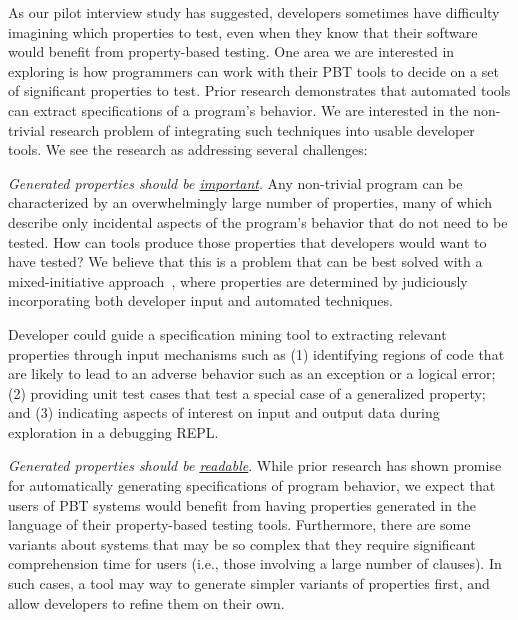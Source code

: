 
 

As our pilot interview study has suggested, developers sometimes have
difficulty imagining which properties to test, even when they know that their
software would benefit from property-based testing. One area we are interested
in exploring is how programmers can work with their PBT tools to decide on a set
of significant properties to test.  Prior research demonstrates that automated
tools can extract specifications of a program's
behavior\cite{ammons2002mining,le2018deep,claessen2010quickspec}. We are
interested in the non-trivial research problem of integrating such techniques
into usable developer tools. We see the research as addressing several
challenges:

\textit{Generated properties should be \underline{important}}. Any non-trivial
program can be characterized by an overwhelmingly large number of properties,
many of which describe only incidental aspects of the program's behavior that do
not need to be tested. How can tools produce those properties that developers
would want to have tested? We believe that this is a problem that can be best
solved with a mixed-initiative approach~\cite{allen1999mixed}, where properties
are determined by judiciously incorporating both developer input and automated
techniques.

Developer could guide a specification mining tool to extracting relevant
properties through input mechanisms such as (1) identifying regions of code that
are likely to lead to an adverse behavior such as an exception or a logical
error; (2) providing unit test cases that test a special case of a generalized
property; and (3) indicating aspects of interest on input and output data during
exploration in a debugging REPL.

\textit{Generated properties should be \underline{readable}}. While prior research
has shown promise for automatically generating specifications of program
behavior, we expect that users of PBT systems would benefit from having
properties generated in the language of their property-based testing tools.
Furthermore, there are some variants about systems that may be so complex that
they require significant comprehension time for users (i.e., those involving a
large number of clauses). In such cases, a tool may way to generate simpler
variants of properties first, and allow developers to refine them on their own.

